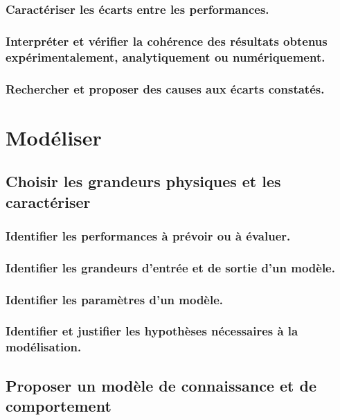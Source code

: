 \documentclass[10pt,fleqn]{book}
\begin{document}
\subsection{Caractériser les écarts entre les performances.} 

\subsection{Interpréter et vérifier la cohérence des résultats obtenus expérimentalement, analytiquement ou numériquement. } 

\subsection{Rechercher et proposer des causes aux écarts constatés.} 

\chapter{Modéliser} 

\section{Choisir les grandeurs physiques et les caractériser} 

\subsection{Identifier les performances à prévoir ou à évaluer.} 

\subsection{Identifier les grandeurs d'entrée et de sortie d’un modèle.} 

\subsection{Identifier les paramètres d’un modèle.} 

\subsection{Identifier et justifier les hypothèses nécessaires à la modélisation.} 

\section{Proposer un modèle de connaissance et de comportement} 
\end{document}
